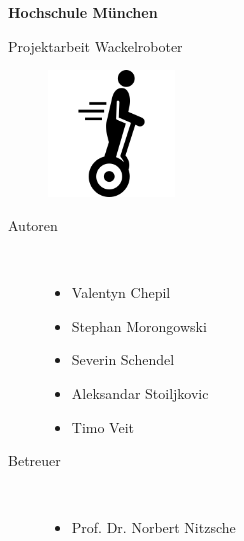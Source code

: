\documentclass[12pt,a4paper,ngerman]{article}
\begin{document}
\setlength{\parindent}{0pt} %

\begin{titlepage}
\begin{flushleft}
\begin{Huge}
\textbf{Hochschule München}
\par\medskip
Projektarbeit Wackelroboter
\end{Huge}
\begin{large}
\par\bigskip
\par\bigskip
\par\bigskip
\par\bigskip
\begin{figure}[h]
\centering\includegraphics[width=0.3\textwidth]{images/segwayIcon.png}

\end{figure}

\par\bigskip
\par\bigskip
\par\bigskip
\par\bigskip

\begin{description}
\item[Autoren]~\par
\begin{itemize}
\item Valentyn Chepil
\item Stephan Morongowski
\item Severin Schendel
\item Aleksandar Stoiljkovic
\item Timo Veit
\end{itemize}
\end{description}


\begin{description}
\item[Betreuer]~\par
\begin{itemize}
\item Prof. Dr. Norbert Nitzsche
\end{itemize}
\end{description}


\end{large}
\end{flushleft}


\vfill %
\end{titlepage}
\end{document}
